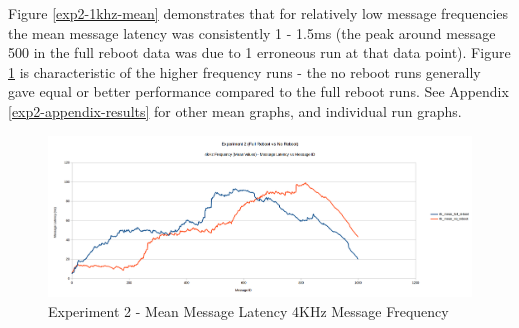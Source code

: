 \documentclass{l4proj}
\begin{document}
Figure \ref{exp2-1khz-mean} demonstrates that for relatively low message frequencies the mean message latency was consistently 1 - 1.5ms (the peak around message 500 in the full reboot data was due to 1 erroneous run at that data point). Figure \ref{exp2-4khz-mean} is characteristic of the higher frequency runs - the no reboot runs generally gave equal or better performance compared to the full reboot runs. See Appendix \ref{exp2-appendix-results} for other mean graphs, and individual run graphs.

\begin{figure}[h]
\centering
\includegraphics[width=\textwidth]{images/4khz-mean.png}
\caption{Experiment 2 - Mean Message Latency 4KHz Message Frequency}
\label{exp2-4khz-mean}
\end{figure}
\end{document}
